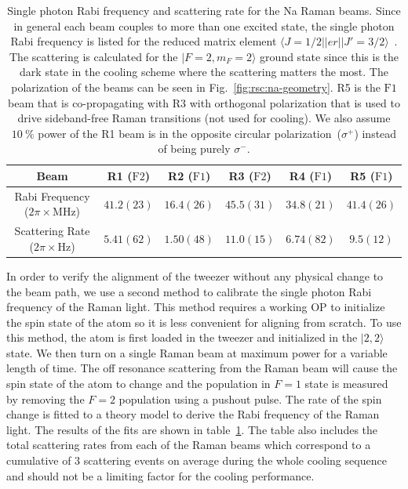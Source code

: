 \begin{table}
  \centering
  \caption[Na Raman beams parameters.]{
    Single photon Rabi frequency and scattering rate for the Na Raman beams.
    Since in general each beam couples to more than one excited state,
    the single photon Rabi frequency is listed for the reduced matrix element
    $\langle J=1/2||er||J'=3/2\rangle$~\cite{steck_sodium_2019}.
    The scattering is calculated for the $|F=2,m_F=2\rangle$ ground state
    since this is the dark state in the cooling scheme where the scattering matters the most.
    The polarization of the beams can be seen in Fig.~\ref{fig:rsc:na-geometry}.
    R5 is the $\mathrm{F1}$ beam that is co-propagating with R3 with orthogonal polarization
    that is used to drive sideband-free Raman transitions (not used for cooling).
    We also assume $10~\mathrm{\%}$ power of the R1 beam is
    in the opposite circular polarization~($\sigma^+$) instead of being purely $\sigma^-$.
    \label{table:rsc:alignment:raman-parameter}}
  \begin{tabular}{|c|c|c|c|c|c|}
    \hline
    Beam&R1 ($\mathrm{F2}$)&R2 ($\mathrm{F1}$)&R3 ($\mathrm{F2}$)
    &R4 ($\mathrm{F1}$)&R5 ($\mathrm{F1}$)\\\hline
    \makecell{Rabi Frequency\\($2\pi\times\mathrm{MHz}$)}&$41.2(23)$&$16.4(26)$&$45.5(31)$
    &$34.8(21)$&$41.4(26)$\\\hline
    \makecell{Scattering Rate\\($2\pi\times\mathrm{Hz}$)}&$5.41(62)$&$1.50(48)$&$11.0(15)$
    &$6.74(82)$&$9.5(12)$\\\hline
  \end{tabular}
\end{table}

In order to verify the alignment of the tweezer without any physical change to the beam path,
we use a second method to calibrate the single photon Rabi frequency of the Raman light.
This method requires a working OP to initialize the spin state of the atom
so it is less convenient for aligning from scratch.
To use this method, the atom is first loaded in the tweezer and initialized
in the $|2,2\rangle$ state. We then turn on a single Raman beam at maximum power for a
variable length of time. The off resonance scattering from the Raman beam will cause
the spin state of the atom to change and the population in $F=1$ state is measured
by removing the $F=2$ population using a pushout pulse.
The rate of the spin change is fitted to a theory model to derive the Rabi frequency of
the Raman light.
The results of the fits are shown in table~\ref{table:rsc:alignment:raman-parameter}.
The table also includes the total scattering rates from each of the Raman beams
which correspond to a cumulative of $3$ scattering events
on average during the whole cooling sequence and
should not be a limiting factor for the cooling performance.

